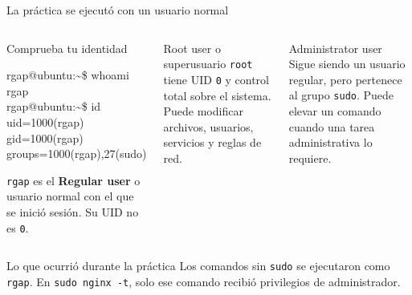 \documentclass[aspectratio=169,10pt,c]{beamer}
\begin{document}
\begin{frame}{La práctica se ejecutó con un usuario normal}
\begin{columns}[T,onlytextwidth]
\begin{exampleblock}{Comprueba tu identidad}
\begin{terminal}\footnotesize
rgap@ubuntu:\textasciitilde\$ whoami\\
rgap\\
rgap@ubuntu:\textasciitilde\$ id\\
uid=1000(rgap) gid=1000(rgap)\\
groups=1000(rgap),27(sudo)
\end{terminal}
\small \texttt{rgap} es el \textbf{Regular user} o usuario normal con el que se inició sesión. Su UID no es \texttt{0}.
\end{exampleblock}
\begin{block}{Root user o superusuario}
\small \texttt{root} tiene UID \texttt{0} y control total sobre el sistema. Puede modificar archivos, usuarios, servicios y reglas de red.
\end{block}
\begin{block}{Administrator user}
\small Sigue siendo un usuario regular, pero pertenece al grupo \texttt{sudo}. Puede elevar un comando cuando una tarea administrativa lo requiere.
\end{block}
\end{columns}
\begin{alertblock}{Lo que ocurrió durante la práctica}
\small Los comandos sin \texttt{sudo} se ejecutaron como \texttt{rgap}. En \texttt{sudo nginx -t}, solo ese comando recibió privilegios de administrador.
\end{alertblock}
\end{frame}
\end{document}
